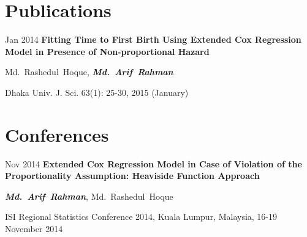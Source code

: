 \section{Publications}

\begin{samepage}
    \begin{twocolentry}{
        Jan 2014
    }
        \textbf{Fitting Time to First Birth Using Extended Cox Regression Model in Presence of Non-proportional Hazard}

        \vspace{0.10 cm}

        \mbox{Md. Rashedul Hoque}, \mbox{\textbf{\textit{Md. Arif Rahman}}}
    \end{twocolentry}

    \vspace{0.10 cm}

    \begin{onecolentry}
        Dhaka Univ. J. Sci. 63(1): 25-30, 2015 (January)
    \end{onecolentry}
\end{samepage}


\section{Conferences}
\begin{samepage}
    \begin{twocolentry}{
        Nov 2014
    }
        \textbf{Extended Cox Regression Model in Case of Violation of the Proportionality Assumption: Heaviside Function Approach}

        \vspace{0.10 cm}

        \mbox{\textbf{\textit{Md. Arif Rahman}}}, \mbox{Md. Rashedul Hoque}
    \end{twocolentry}

    \vspace{0.10 cm}

    \begin{onecolentry}
        ISI Regional Statistics Conference 2014, Kuala Lumpur, Malaysia, 16-19 November 2014
    \end{onecolentry}
\end{samepage}




